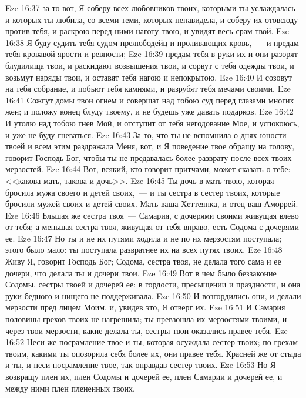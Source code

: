 \vs Eze 16:37 за то вот, Я соберу всех любовников твоих, которыми ты услаждалась и которых ты любила, со всеми теми, которых ненавидела, и соберу их отовсюду против тебя, и раскрою перед ними наготу твою, и увидят весь срам твой.
\vs Eze 16:38 Я буду судить тебя судом прелюбодейц и проливающих кровь,~--- и предам тебя кровавой ярости и ревности;
\vs Eze 16:39 предам тебя в руки их и они разорят блудилища твои, и раскидают возвышения твои, и сорвут с тебя одежды твои, и возьмут наряды твои, и оставят тебя нагою и непокрытою.
\vs Eze 16:40 И созовут на тебя собрание, и побьют тебя камнями, и разрубят тебя мечами своими.
\vs Eze 16:41 Сожгут домы твои огнем и совершат над тобою суд перед глазами многих жен; и положу конец блуду твоему, и не будешь уже давать подарков.
\vs Eze 16:42 И утолю над тобою гнев Мой, и отступит от тебя негодование Мое, и успокоюсь, и уже не буду гневаться.
\vs Eze 16:43 За то, что ты не вспомнила о днях юности твоей и всем этим раздражала Меня, вот, и Я поведение твое обращу на  голову, говорит Господь Бог, чтобы ты не предавалась более разврату после всех твоих мерзостей.
\vs Eze 16:44 Вот, всякий, кто говорит притчами, может сказать о тебе: <<какова мать, такова и дочь>>.
\vs Eze 16:45 Ты дочь в мать твою, которая бросила мужа своего и детей своих,~--- и ты сестра в сестер твоих, которые бросили мужей своих и детей своих. Мать ваша Хеттеянка, и отец ваш Аморрей.
\vs Eze 16:46 Бльшая же сестра твоя~--- Самария, с дочерями своими живущая влево от тебя; а меньшая сестра твоя, живущая от тебя вправо, есть Содома с дочерями ее.
\vs Eze 16:47 Но ты и не их путями ходила и не по их мерзостям поступала; этого было мало: ты поступала развратнее их на всех путях твоих.
\vs Eze 16:48 Живу Я, говорит Господь Бог; Содома, сестра твоя, не делала того сама и ее дочери, что делала ты и дочери твои.
\vs Eze 16:49 Вот в чем было беззаконие Содомы, сестры твоей и дочерей ее: в гордости, пресыщении и праздности, и она руки бедного и нищего не поддерживала.
\vs Eze 16:50 И возгордились они, и делали мерзости пред лицем Моим, и, увидев это, Я отверг их.
\vs Eze 16:51 И Самария половины грехов твоих не нагрешила; ты превзошла их мерзостями твоими, и через твои мерзости, какие делала ты, сестры твои оказались правее тебя.
\vs Eze 16:52 Неси же посрамление твое и ты, которая осуждала сестер твоих; по грехам твоим, какими ты опозорила себя более их, они правее тебя. Красней же от стыда и ты, и неси посрамление твое, так оправдав сестер твоих.
\vs Eze 16:53 Но Я возвращу плен их, плен Содомы и дочерей ее, плен Самарии и дочерей ее, и между ними плен плененных твоих,
